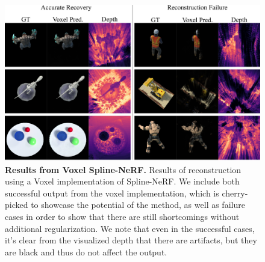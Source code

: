 \documentclass[runningheads]{llncs}
\begin{document}
\begin{figure}
    \centering
    \includegraphics[width=\textwidth]{voxel_results}
    \caption{
        \label{fig:voxel_results}
        \textbf{Results from Voxel Spline-NeRF.} Results of reconstruction using a Voxel implementation of Spline-NeRF. We include both successful output from the voxel implementation, which is cherry-picked to showcase the potential of the method, as well as failure cases in order to show that there are still shortcomings without additional regularization. We note that even in the successful cases, it's clear from the visualized depth that there are artifacts, but they are black and thus do not affect the output.
    }
\end{figure}
\end{document}
